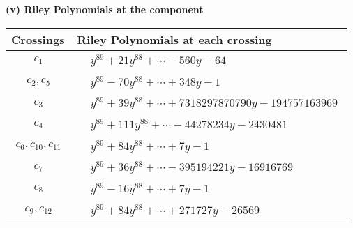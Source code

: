 \documentclass[1p]{elsarticle_modified}
\theoremstyle{definition}
\begin{document}
\newpage\renewcommand{\arraystretch}{1}
\flushleft \textbf{(v) Riley Polynomials at the component}\newline \\
\begin{tabular}{m{50pt}|m{274pt}}
Crossings & \hspace{64pt}Riley Polynomials at each crossing \\
\hline $$\begin{aligned}c_{1}\end{aligned}$$&$\begin{aligned}
&y^{89}+21 y^{88}+\cdots-560 y-64
\end{aligned}$\\
\hline $$\begin{aligned}c_{2},c_{5}\end{aligned}$$&$\begin{aligned}
&y^{89}-70 y^{88}+\cdots+348 y-1
\end{aligned}$\\
\hline $$\begin{aligned}c_{3}\end{aligned}$$&$\begin{aligned}
&y^{89}+39 y^{88}+\cdots+7318297870790 y-194757163969
\end{aligned}$\\
\hline $$\begin{aligned}c_{4}\end{aligned}$$&$\begin{aligned}
&y^{89}+111 y^{88}+\cdots-44278234 y-2430481
\end{aligned}$\\
\hline $$\begin{aligned}c_{6},c_{10},c_{11}\end{aligned}$$&$\begin{aligned}
&y^{89}+84 y^{88}+\cdots+7 y-1
\end{aligned}$\\
\hline $$\begin{aligned}c_{7}\end{aligned}$$&$\begin{aligned}
&y^{89}+36 y^{88}+\cdots-395194221 y-16916769
\end{aligned}$\\
\hline $$\begin{aligned}c_{8}\end{aligned}$$&$\begin{aligned}
&y^{89}-16 y^{88}+\cdots+7 y-1
\end{aligned}$\\
\hline $$\begin{aligned}c_{9},c_{12}\end{aligned}$$&$\begin{aligned}
&y^{89}+84 y^{88}+\cdots+271727 y-26569
\end{aligned}$\\
\hline
\end{tabular}\\~\\
\end{document}

